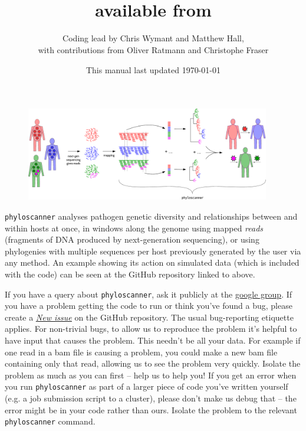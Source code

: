 \documentclass{article}
\title{\p\\available from \href{https://github.com/BDI-pathogens/phyloscanner}{\www{github.com/BDI-pathogens/phyloscanner}}}
\date{This manual last updated \today}
\author{Coding lead by Chris Wymant and Matthew Hall,\\with contributions from Oliver Ratmann and Christophe Fraser}
\newcommand{\p}{\texttt{phyloscanner}\xspace}
\newcommand{\www}{\color{blue} \underline}
\begin{document}
\maketitle


\begin{figure}[!h]
\centering
\includegraphics[width=0.95\textwidth]{PhyloscannerDiagram_big4.pdf}
\end{figure}

\vspace*{5mm}

\p analyses pathogen genetic diversity and relationships between and within hosts at once, in windows along the genome using mapped {\it reads} (fragments of DNA produced by next-generation sequencing), or using phylogenies with multiple sequences per host previously generated by the user via any method.
An example showing its action on simulated data (which is included with the code) can be seen at the GitHub repository linked to above.

\vspace*{5mm}

If you have a query about \p, ask it publicly at the \href{https://groups.google.com/forum/\#!forum/phyloscanner-users}{\www{google group}}.  
If you have a problem getting the code to run or think you've found a bug, please create a \href{https://github.com/BDI-pathogens/phyloscanner/issues}{\www{\it New issue}} on the GitHub repository.
The usual bug-reporting etiquette applies.
For non-trivial bugs, to allow us to reproduce the problem it's helpful to have input that causes the problem.
This needn't be all your data.
For example if one read in a bam file is causing a problem, you could make a new bam file containing only that read, allowing us to see the problem very quickly.
Isolate the problem as much as you can first -- help us to help you!
If you get an error when you run \p as part of a larger piece of code you've written yourself (e.g. a job submission script to a cluster), please don't make us debug that -- the error might be in your code rather than ours.
Isolate the problem to the relevant \p command.
\end{document}
